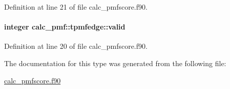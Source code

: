 Definition at line 21 of file calc\-\_\-pmfscore.\-f90.

\hypertarget{structcalc__pmf_1_1tpmfedge_a9590ce792a9baa267959e9b057c7dd28}{
\paragraph[{valid}]{\setlength{\rightskip}{0pt plus 5cm}integer calc\-\_\-pmf\-::tpmfedge\-::valid}}\label{structcalc__pmf_1_1tpmfedge_a9590ce792a9baa267959e9b057c7dd28}


Definition at line 20 of file calc\-\_\-pmfscore.\-f90.



The documentation for this type was generated from the following file\-:\begin{DoxyCompactItemize}
\item 
\hyperlink{calc__pmfscore_8f90}{calc\-\_\-pmfscore.\-f90}\end{DoxyCompactItemize}
